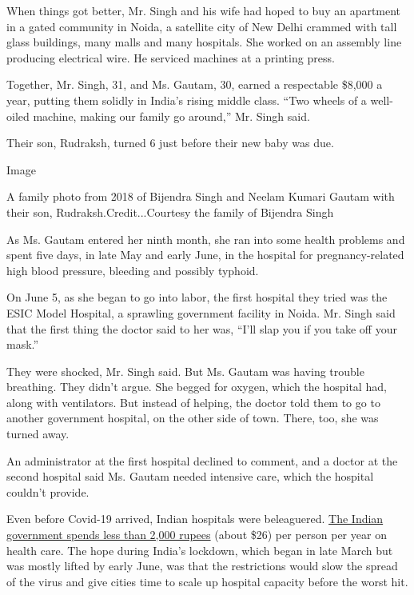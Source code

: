When things got better, Mr. Singh and his wife had hoped to buy an
apartment in a gated community in Noida, a satellite city of New Delhi
crammed with tall glass buildings, many malls and many hospitals. She
worked on an assembly line producing electrical wire. He serviced
machines at a printing press.

Together, Mr. Singh, 31, and Ms. Gautam, 30, earned a respectable
\$8,000 a year, putting them solidly in India's rising middle class.
``Two wheels of a well-oiled machine, making our family go around,'' Mr.
Singh said.

Their son, Rudraksh, turned 6 just before their new baby was due.

Image

A family photo from 2018 of Bijendra Singh and Neelam Kumari Gautam with
their son, Rudraksh.Credit...Courtesy the family of Bijendra Singh

As Ms. Gautam entered her ninth month, she ran into some health problems
and spent five days, in late May and early June, in the hospital for
pregnancy-related high blood pressure, bleeding and possibly typhoid.

On June 5, as she began to go into labor, the first hospital they tried
was the ESIC Model Hospital, a sprawling government facility in Noida.
Mr. Singh said that the first thing the doctor said to her was, ``I'll
slap you if you take off your mask.''

They were shocked, Mr. Singh said. But Ms. Gautam was having trouble
breathing. They didn't argue. She begged for oxygen, which the hospital
had, along with ventilators. But instead of helping, the doctor told
them to go to another government hospital, on the other side of town.
There, too, she was turned away.

An administrator at the first hospital declined to comment, and a doctor
at the second hospital said Ms. Gautam needed intensive care, which the
hospital couldn't provide.

Even before Covid-19 arrived, Indian hospitals were beleaguered.
\href{https://www.livemint.com/news/india/india-s-economy-needs-big-dose-of-health-spending-11586365603651.html}{The
Indian government spends less than 2,000 rupees} (about \$26) per person
per year on health care. The hope during India's lockdown, which began
in late March but was mostly lifted by early June, was that the
restrictions would slow the spread of the virus and give cities time to
scale up hospital capacity before the worst hit.

